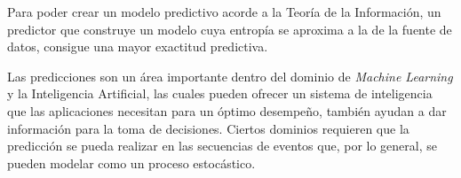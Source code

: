 






Para poder crear un modelo predictivo acorde a la Teoría de la Información, un predictor que construye un modelo cuya entropía se aproxima a la de la fuente de datos, consigue una mayor exactitud predictiva. 


Las predicciones son un área importante dentro del dominio de \emph{Machine Learning} y la Inteligencia Artificial, las cuales pueden ofrecer un sistema de inteligencia que las aplicaciones necesitan para un óptimo desempeño, también ayudan a dar información para la toma de decisiones. Ciertos dominios requieren que la predicción se pueda realizar en las secuencias de eventos que, por lo general, se pueden modelar como un proceso estocástico. 



